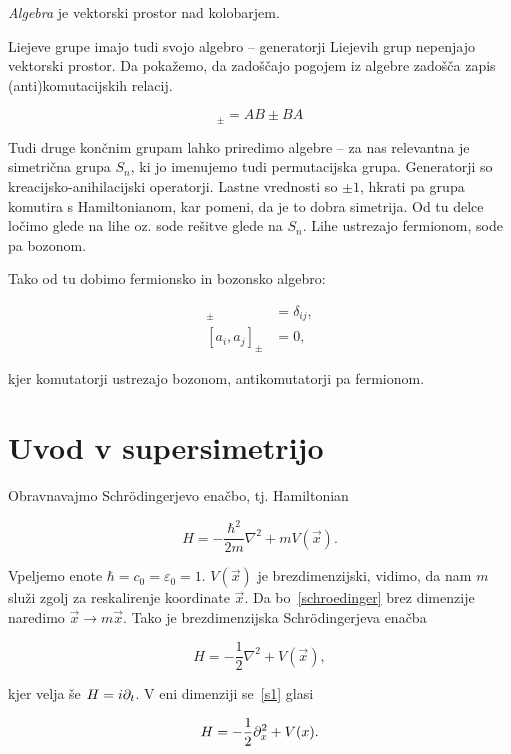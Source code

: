 \emph{Algebra} je vektorski prostor nad kolobarjem.

Liejeve grupe imajo tudi svojo algebro -- generatorji Liejevih grup nepenjajo vektorski
prostor. Da pokažemo, da zadoščajo pogojem iz algebre zadošča zapis (anti)komutacijskih
relacij.

\begin{equation}
	[A,B]_\pm = AB \pm BA
\end{equation}

Tudi druge končnim grupam lahko priredimo algebre -- za nas relevantna je simetrična grupa
$S_n$, ki jo imenujemo tudi permutacijska grupa. Generatorji so kreacijsko-anihilacijski
operatorji. Lastne vrednosti so $\pm 1$, hkrati pa grupa komutira s Hamiltonianom, kar pomeni,
da je to dobra simetrija. Od tu delce ločimo glede na lihe oz. sode rešitve glede na $S_n$. 
Lihe ustrezajo fermionom, sode pa bozonom. 

Tako od tu dobimo fermionsko in bozonsko algebro:

\begin{align}
	[a_i, a_j^\dagger]_\pm &= \delta_{ij}, \\
	[a_i, a_j]_\pm &= 0,
\end{align}

kjer komutatorji ustrezajo bozonom, antikomutatorji pa fermionom.

\section{Uvod v supersimetrijo}

Obravnavajmo Schr\" odingerjevo enačbo, tj. Hamiltonian

\begin{equation}
	H = -\frac{\hbar^2}{2m}\nabla^2 + mV(\vec{x}).
	\label{schroedinger}
\end{equation}

Vpeljemo enote $\hbar = c_0 = \varepsilon_0 = 1$. $V(\vec{x})$ je brezdimenzijski, vidimo, da
nam $m$ služi zgolj za reskalirenje koordinate $\vec{x}$. Da bo~\eqref{schroedinger} brez
dimenzije naredimo $\vec{x} \to m\vec{x}$. Tako je brezdimenzijska Schr\" odingerjeva enačba

\begin{equation}
	H = -\frac{1}{2}\nabla^2 + V(\vec{x}),
	\label{s1}
\end{equation}

kjer velja še $H = i\partial_t$. V eni dimenziji se~\eqref{s1} glasi

\begin{equation}
	H = -\frac{1}{2}\partial_x^2 + V(x).
	\label{sx}
\end{equation}

